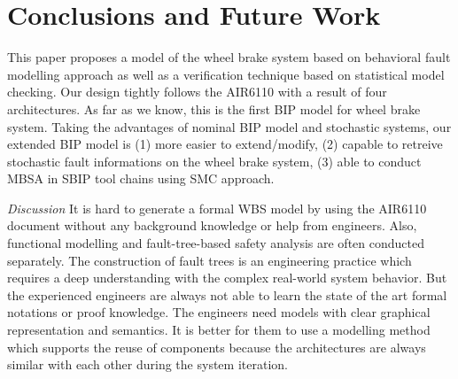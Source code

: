 \documentclass[runningheads]{llncs}
\begin{document}




\section{Conclusions and Future Work}
This paper proposes a model of the wheel brake system based on behavioral fault modelling approach as well as a verification technique based on statistical model checking. Our design tightly follows the AIR6110 with a result of four architectures. As far as we know, this is the first BIP model for wheel brake system. Taking the advantages of nominal BIP model and stochastic systems, our extended BIP model is (1) more easier to extend/modify, (2) capable to retreive stochastic fault informations on the wheel brake system, (3) able to conduct MBSA in SBIP tool chains using SMC approach.

\begin{comment}
The work of\cite{aadl14}\cite{aadl} focused on an extension of AADL Error Model called Annex, using WBS as an example. They find it hard to adding faults to existing components, and the integration process can obscure the nominal behaviors of the model. The paper\cite{cav15} proposes a formal modelling and analysis of WBS based on an integration of serveral approaches including OCRA, NuXmv and xSAP. They using a cluster of machines with massive memories and time, but also faces with time out problems during computation. However (1) our model is more easier to extend/modify due to the use of the component-based design approach, (2) the integrated model is more concrete due to the use of our behavioral fault modelling approach, (3) we are capable to retreive stochastic informations on the wheel brake system.
\end{comment}

\emph{Discussion} It is hard to generate a formal WBS model by using the AIR6110 document without any background knowledge or help from engineers. Also, functional modelling and fault-tree-based safety analysis are often conducted separately.  The construction of fault trees is an engineering practice which requires a deep understanding with the complex real-world system behavior. But the experienced engineers are always not able to learn the state of the art formal notations or proof knowledge. The engineers need models with clear graphical representation and semantics. It is better for them to use a modelling method which supports the reuse of components because the architectures are always similar with each other during the system iteration.
\end{document}
